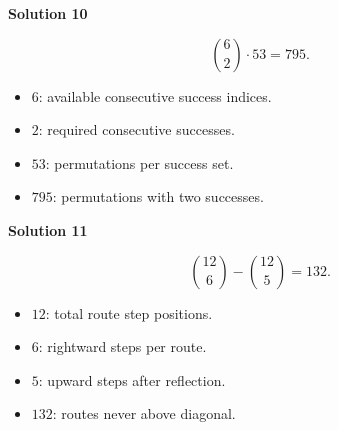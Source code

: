 \documentclass[11pt]{article}
\newcommand{\solution}[1]{%
  \par\Needspace{5\baselineskip}\addvspace{.8\baselineskip}%
  {\large\bfseries Solution #1\par}\nopagebreak[4]}
\begin{document}
\solution{10}
\[
\binom62\cdot53=\boxed{795}.
\]
\begin{itemize}
\item \(6\): available consecutive success indices.
\item \(2\): required consecutive successes.
\item \(53\): permutations per success set.
\item \(795\): permutations with two successes.
\end{itemize}

\solution{11}
\[
\binom{12}{6}-\binom{12}{5}=\boxed{132}.
\]
\begin{itemize}
\item \(12\): total route step positions.
\item \(6\): rightward steps per route.
\item \(5\): upward steps after reflection.
\item \(132\): routes never above diagonal.
\end{itemize}
\endgroup
\end{document}
